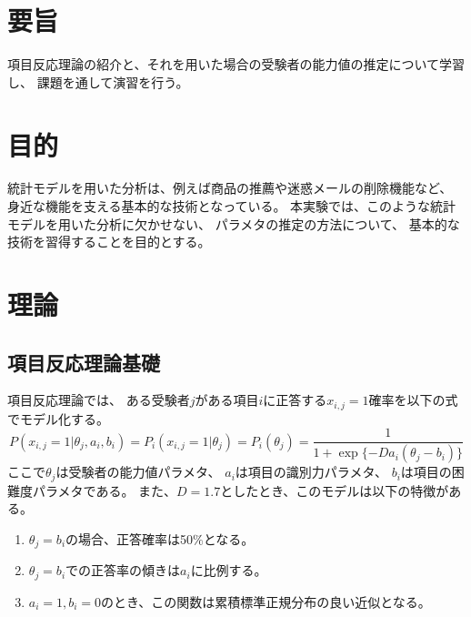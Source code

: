 \documentclass[12pt]{jarticle}
\begin{document}



\section{要旨}
項目反応理論の紹介と、それを用いた場合の受験者の能力値の推定について学習し、
課題を通して演習を行う。

\section{目的}
統計モデルを用いた分析は、例えば商品の推薦や迷惑メールの削除機能など、
身近な機能を支える基本的な技術となっている。
本実験では、このような統計モデルを用いた分析に欠かせない、
パラメタの推定の方法について、
基本的な技術を習得することを目的とする。

\section{理論}
\subsection{項目反応理論基礎}
項目反応理論では、
ある受験者$j$がある項目$i$に正答する$x_{i,j}=1$確率を以下の式でモデル化する。
\begin{equation}
    P(x_{i,j}=1|\theta_j,a_i,b_i)=P_i(x_{i,j}=1|\theta_j)=P_i(\theta_j)=\frac{1}{1+\exp\{-Da_i(\theta_j -b_i)\}}
\end{equation}
ここで$\theta_j$は受験者の能力値パラメタ、
$a_i$は項目の識別力パラメタ、
$b_i$は項目の困難度パラメタである。
また、$D=1.7$としたとき、このモデルは以下の特徴がある。
\begin{enumerate}
    \item $\theta_j=b_i$の場合、正答確率は50$\%$となる。
    \item $\theta_j=b_i$での正答率の傾きは$a_i$に比例する。
    \item $a_i=1,b_i=0$のとき、この関数は累積標準正規分布の良い近似となる。
\end{enumerate}
\end{document}
